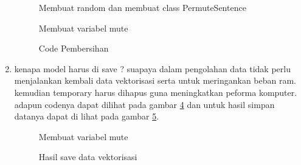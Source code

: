 \begin{enumerate}
\begin{figure}[!htbp]
      \caption{Membuat random dan membuat class PermuteSentence}
      \label{c99}
      \end{figure}

\begin{figure}[!htbp]
      \caption{Membuat variabel mute}
      \label{c100}
      \end{figure}

\begin{figure}[!htbp]
      \caption{Code Pembersihan}
      \label{c101}
      \end{figure}

\item kenapa model harus di save ? suapaya dalam pengolahan data tidak perlu menjalankan kembali data vektorisasi serta untuk meringankan beban ram. kemudian temporary harus dihapus guna meningkatkan peforma komputer. adapun codenya dapat dilihat pada gambar \ref{c102} dan untuk hasil simpan datanya dapat di lihat pada gambar \ref{c103}.

\begin{figure}[!htbp]
      \caption{Membuat variabel mute}
      \label{c102}
      \end{figure}

\begin{figure}[!htbp]
      \caption{Hasil save data vektorisasi}
      \label{c103}
      \end{figure}


\end{enumerate}
